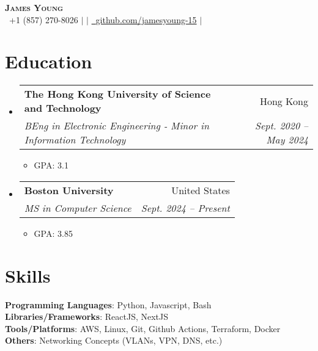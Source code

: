 \documentclass[letterpaper,12pt]{article}
\makeatletter
\newcommand{\resumeItem}[1]{
  \item\small{
    {#1 \vspace{-2pt}}
  }
}
\newcommand{\resumeSubheading}[4]{
  \vspace{-2pt}\item
    \begin{tabular*}{0.97\textwidth}[t]{l@{\extracolsep{\fill}}r}
      \textbf{#1} & #2 \\
      \textit{\small#3} & \textit{\small #4} \\
    \end{tabular*}\vspace{-7pt}
}
\newcommand{\resumeSubHeadingListStart}{\begin{itemize}[leftmargin=0.05in, label={}]}
\newcommand{\resumeSubHeadingListEnd}{\end{itemize}}
\newcommand{\resumeItemListStart}{\begin{itemize}}
\newcommand{\resumeItemListEnd}{\end{itemize}\vspace{-5pt}}
\makeatother
\begin{document}
\begin{center}
    \textbf{\Huge \scshape James Young} \\ \vspace{2pt}
    \small  \faPhone\ {+1 (857) 270-8026} $|$ 
    \href{mailto:jyyoung@bu.edu}{} $|$ 
    \href{https://github.com/jamesyoung-15} {\faGithub\ {github.com/jamesyoung-15}} $|$
    \href{https://linkedin.com/in/jamesyyoung}{}
\end{center}


\section{Education}
  \resumeSubHeadingListStart
    \resumeSubheading
      {The Hong Kong University of Science and Technology}{Hong Kong}
      {BEng in Electronic Engineering - Minor in Information Technology}{Sept. 2020 -- May 2024}
      \resumeItemListStart
      \resumeItem{GPA: 3.1}
    \resumeItemListEnd
    \resumeSubheading
      {Boston University}{United States}
      {MS in Computer Science}{Sept. 2024 -- Present}
      \resumeItemListStart
      \resumeItem{GPA: 3.85}
    \resumeItemListEnd
  \resumeSubHeadingListEnd



\vspace{-20pt}
\section{Skills}
 \begin{itemize}[leftmargin=0.15in, label={}]
    \small{\item{
     \textbf{Programming Languages}{: Python, Javascript, Bash} \\
      \textbf{Libraries/Frameworks}{: ReactJS, NextJS} \\
     \textbf{Tools/Platforms}{: AWS, Linux, Git, Github Actions, Terraform, Docker} \\ 
     \textbf{Others}{: Networking Concepts (VLANs, VPN, DNS, etc.)} \\
    }}
 \end{itemize}
\end{document}
